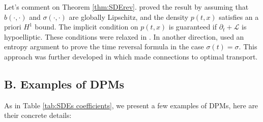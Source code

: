 \documentclass[letterpaper,10pt,reqno]{amsart}
\numberwithin{equation}{section}
\begin{document}
\quad Let's comment on Theorem \ref{thm:SDErev}.
\cite{HP86} proved the result by assuming that $b(\cdot, \cdot)$ and $\sigma(\cdot, \cdot)$ are globally Lipschitz, and 
the density $p(t,x)$ satisfies an a priori $H^1$ bound. 
The implicit condition on $p(t,x)$ is guaranteed if $\partial_t + \mathcal{L}$ is hypoelliptic.
These conditions were relaxed in \cite{Quastel02}. 
In another direction, \cite{Fo85, Fo86} used an entropy argument to prove the time reversal formula in the case $\sigma(t) = \sigma$. 
This approach was further developed in \cite{CCGL21} which made connections to optimal transport. 

\subsection*{B. Examples of DPMs}

As in Table \ref{tab:SDEs coefficients}, we present a few examples of DPMs, here are their concrete details:
\end{document}
